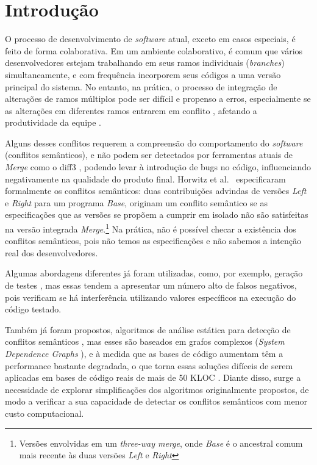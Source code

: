 \section{Introdução}
O processo de desenvolvimento de \emph{software} atual, exceto em casos especiais, é feito de forma colaborativa. Em um ambiente colaborativo, é comum que vários desenvolvedores estejam trabalhando em seus ramos individuais (\emph{branches}) simultaneamente, e com frequência incorporem seus códigos a uma versão principal do sistema. No entanto, na prática, o processo de integração de alterações de ramos múltiplos pode ser difícil e propenso a erros, especialmente se as alterações em diferentes ramos entrarem em conflito \cite{Bird2012AssessingTV}, afetando a produtividade da equipe \cite{6915251}.

Alguns desses conflitos requerem a compreensão do comportamento do \emph{software} (conflitos semânticos), e não podem ser detectados por ferramentas atuais de \emph{Merge} como o diff3 \cite{10.5555/1781794.1781836}, podendo levar à introdução de bugs no código, influenciando negativamente na qualidade do produto final.  Horwitz et al.~\cite{Horwitz1989IntegratingNV} especificaram formalmente os conflitos semânticos: duas contribuições advindas de versões \emph{Left} e \emph{Right} para um programa \emph{Base}, originam um conflito semântico se as especificações que as versões se propõem a cumprir em isolado não são satisfeitas na versão integrada \emph{Merge}.\footnote{Versões envolvidas em um \emph{three-way merge}, onde \emph{Base} é o ancestral comum mais recente às duas versões \emph{Left} e \emph{Right}} 
Na prática, não é possível checar a existência dos conflitos semânticos, pois não temos as especificações e não sabemos a intenção real dos desenvolvedores.

Algumas abordagens diferentes já foram utilizadas, como, por exemplo, geração de testes \cite{LeusonSilva2020}, mas essas tendem a apresentar um número alto de falsos negativos, pois verificam se há interferência utilizando valores específicos na execução do código testado.

Também já foram propostos, algoritmos de análise estática para detecção de conflitos semânticos  \cite{InformationFlowRoberto, Binkley95programintegration, Horwitz1989IntegratingNV}, mas esses são baseados em grafos complexos (\emph{System Dependence Graphs} \cite{Horwitz1989IntegratingNV}), e à medida que as bases de código aumentam têm a performance bastante degradada, o que torna essas soluções difíceis de serem aplicadas em bases de código reais de mais de 50 KLOC \cite{InformationFlowRoberto}. Diante disso, surge a necessidade de explorar simplificações dos algoritmos originalmente propostos, de modo a verificar a sua capacidade de detectar os conflitos semânticos com menor custo computacional.

